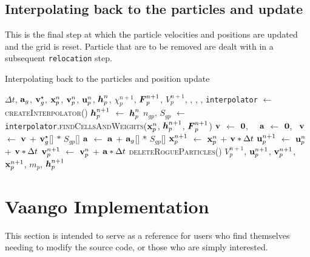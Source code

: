 \subsection{Interpolating back to the particles and update}
This is the final step at which the particle velocities and positions are updated and the grid
is reset.  Particle that are to be removed are dealt with in a subsequent \texttt{relocation} step.
\begin{breakablealgorithm}
  \caption{Interpolating back to the particles and position update}
  \begin{algorithmic}[1]
    \Require $\Delta t$, 
             $\mathbf{a}_g$, $\mathbf{v}_g^\star$, $\mathbf{x}_p^n$, $\mathbf{v}_p^n$, $\mathbf{u}_p^n$, $\boldsymbol{h}_p^n$, $\chi_p^{n+1}$, $\boldsymbol{F}_p^{n+1}$,
             $V_p^{n+1}$,
             , , , 
      \State \texttt{interpolator} $\leftarrow$ \textsc{createInterpolator}()
        \State $\boldsymbol{h}_p^{n+1}$ $\leftarrow$ $\boldsymbol{h}_p^n$
          \State $n_{gp}$, $S_{gp}$ $\leftarrow$ 
            \texttt{interpolator}.\textsc{findCellsAndWeights}($\mathbf{x}_p^n$, $\boldsymbol{h}_p^{n+1}$, $\boldsymbol{F}_p^{n+1}$)
          \State $\mathbf{v}$ $\leftarrow$ $\boldsymbol{0}$,~~ $\mathbf{a}$ $\leftarrow$ $\boldsymbol{0}$,~
            \State $\mathbf{v}$ $\leftarrow$ $\mathbf{v}$ + $\mathbf{v}_g^\star$[\TTnode] $*$ $S_{gp}$[\TTnode]
            \State $\mathbf{a}$ $\leftarrow$ $\mathbf{a}$ + $\mathbf{a}_g$[\TTnode] $*$ $S_{gp}$[\TTnode]
          \EndFor
          \State $\mathbf{x}_p^{n+1}$ $\leftarrow$ $\mathbf{x}_p^n$ + $\mathbf{v} * \Delta t$
          \State $\mathbf{u}_p^{n+1}$ $\leftarrow$ $\mathbf{u}_p^n$ + $\mathbf{v} * \Delta t$
          \State $\mathbf{v}_p^{n+1}$ $\leftarrow$ $\mathbf{v}_p^n$ + $\mathbf{a} * \Delta t$
        \EndFor
      \EndFor
      \State \textsc{deleteRogueParticles}()
      \State \Return $V_p^{n+1}$, $\mathbf{u}_p^{n+1}$, $\mathbf{v}_p^{n+1}$, $\mathbf{x}_p^{n+1}$, $m_p$, $\boldsymbol{h}_p^{n+1}$
    \EndProcedure
  \end{algorithmic}
\end{breakablealgorithm}

\section{Vaango Implementation} \label{Sec:UintahImp}
This section is intended to serve as a reference for users who find themselves needing
to modify the source code, or those who are simply interested.  

